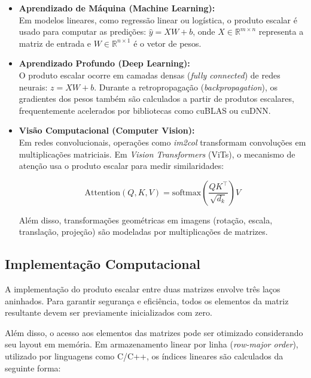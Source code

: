\documentclass[11pt,a4paper]{article}
\begin{document}
\begin{itemize}
	\item \textbf{Aprendizado de Máquina (Machine Learning):} \\
	      Em modelos lineares, como regressão linear ou logística, o produto escalar é usado para computar as predições: \( \hat{y} = XW + b \), onde \( X \in \mathbb{R}^{m \times n} \) representa a matriz de entrada e \( W \in \mathbb{R}^{n \times 1} \) é o vetor de pesos.

	\item \textbf{Aprendizado Profundo (Deep Learning):} \\
	      O produto escalar ocorre em camadas densas (\textit{fully connected}) de redes neurais: \( z = XW + b \). Durante a retropropagação (\textit{backpropagation}), os gradientes dos pesos também são calculados a partir de produtos escalares, frequentemente acelerados por bibliotecas como cuBLAS ou cuDNN.

	\item \textbf{Visão Computacional (Computer Vision):} \\
	      Em redes convolucionais, operações como \textit{im2col} transformam convoluções em multiplicações matriciais. Em \textit{Vision Transformers} (ViTs), o mecanismo de atenção usa o produto escalar para medir similaridades:

	      \[
		      \text{Attention}(Q, K, V) = \text{softmax}\left(\frac{QK^\top}{\sqrt{d_k}}\right)V
	      \]

	      Além disso, transformações geométricas em imagens (rotação, escala, translação, projeção) são modeladas por multiplicações de matrizes.
\end{itemize}

\subsection{Implementação Computacional}

A implementação do produto escalar entre duas matrizes envolve três laços aninhados. Para garantir segurança e eficiência, todos os elementos da matriz resultante devem ser previamente inicializados com zero.

Além disso, o acesso aos elementos das matrizes pode ser otimizado considerando seu layout em memória. Em armazenamento linear por linha (\textit{row-major order}), utilizado por linguagens como C/C++, os índices lineares são calculados da seguinte forma:
\end{document}
